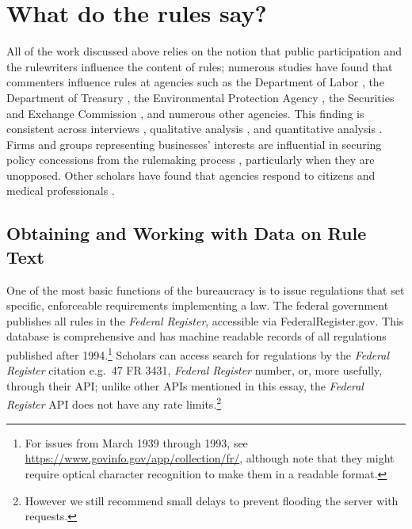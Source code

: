 \documentclass[12pt,notitlepage]{article}
\newcounter{cor}
\begin{document}
\hypertarget{what-do-the-rules-say}{%
\section{What do the rules say?}\label{what-do-the-rules-say}}

All of the work discussed above relies on the notion that public
participation and the rulewriters influence the content of rules;
numerous studies have found that commenters influence rules \citep[see
e.g.,][]{Cuellar_ALR_2005, Yackee_JOP_2006, Naughton_JPAM_2009, Haeder_APSR_2015, Haeder_JPART_2018}
at agencies such as the Department of Labor \citep{Yackee_JOP_2006}, the
Department of Treasury \citep{Cuellar_ALR_2005}, the Environmental
Protection Agency \citep{Wagner_ALR_2011}, the Securities and Exchange
Commission \citep{Rashin_2019}, and numerous other agencies. This
finding is consistent across interviews
\citep[e.g.,][]{Furlong_JPART_1998}, qualitative analysis
\citep[e.g.,][]{Cuellar_ALR_2005}, and quantitative analysis
\citep[e.g.,][]{Yackee_JOP_2006}. Firms and groups representing
businesses' interests are influential in securing policy concessions
from the rulemaking process
\citep{Yackee_JPART_2006, Yackee_JOP_2006, Carpenter_2013}, particularly
when they are unopposed. Other scholars have found that agencies respond
to citizens \citep{Balla_PI_2019} and medical professionals
\citep{Balla_APSR_1998, Gordon_Rashin_JOP}.

\hypertarget{obtaining-and-working-with-data-on-rule-text}{%
\subsection*{Obtaining and Working with Data on Rule
Text}\label{obtaining-and-working-with-data-on-rule-text}}

One of the most basic functions of the bureaucracy is to issue
regulations that set specific, enforceable requirements implementing a
law. The federal government publishes all rules in the \emph{Federal
Register}, accessible via FederalRegister.gov. This database is
comprehensive and has machine readable records of all regulations
published after 1994.\footnote{For issues from March 1939 through 1993,
  see \url{https://www.govinfo.gov/app/collection/fr/}, although note
  that they might require optical character recognition to make them in
  a readable format.} Scholars can access search for regulations by the
\emph{Federal Register} citation e.g.~47 FR 3431, \emph{Federal
Register} number, or, more usefully, through their API; unlike other
APIs mentioned in this essay, the \emph{Federal Register} API does not
have any rate limits.\footnote{However we still recommend small delays
  to prevent flooding the server with requests.}
\end{document}
